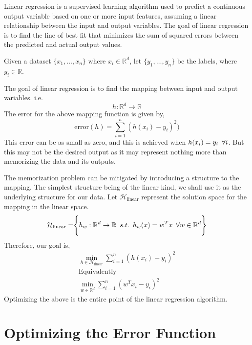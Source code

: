\documentclass[
]{article}
\begin{document}
Linear regression is a supervised learning algorithm used to predict a
continuous output variable based on one or more input features, assuming
a linear relationship between the input and output variables. The goal
of linear regression is to find the line of best fit that minimizes the
sum of squared errors between the predicted and actual output values.

Given a dataset \(\{x_1, \ldots, x_n\}\) where \(x_i \in \mathbb{R}^d\),
let \(\{y_1, \ldots, y_n\}\) be the labels, where
\(y_i \in \mathbb{R}\).

The goal of linear regression is to find the mapping between input and
output variables. i.e. \[
h: \mathbb{R}^d \rightarrow \mathbb{R}
\] The error for the above mapping function is given by, \[
\text{error}(h) = \sum _{i=1} ^n (h(x_i) - y_i) ^2)
\] This error can be as small as zero, and this is achieved when
\(h(x_i)=y_i \hspace{0.5em} \forall i\). But this may not be the desired
output as it may represent nothing more than memorizing the data and its
outputs.

The memorization problem can be mitigated by introducing a structure to
the mapping. The simplest structure being of the linear kind, we shall
use it as the underlying structure for our data. Let
\(\mathcal{H}_{\text{linear}}\) represent the solution space for the
mapping in the linear space. \[
\mathcal{H}_{\text{linear}}=\Biggr \lbrace{h_w: \mathbb{R}^d \rightarrow \mathbb{R} \hspace{0.5em} s.t. \hspace{0.5em} h_w(x)=w^Tx \hspace{0.5em} \forall w \in \mathbb{R}^d } \Biggr \rbrace
\] Therefore, our goal is, \begin{align*}
\min _{h \in \mathcal{H}_{\text{linear}}} \sum _{i=1} ^n (h(x_i) - y_i) ^2 \\
\text{Equivalently} \\
\min _{w \in \mathbb{R}^d} \sum _{i=1} ^n (w^Tx_i - y_i) ^2
\end{align*} Optimizing the above is the entire point of the linear
regression algorithm.

\newpage
\hypertarget{optimizing-the-error-function}{%
\section{Optimizing the Error
Function}\label{optimizing-the-error-function}}
\end{document}
